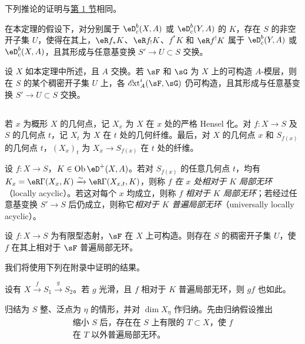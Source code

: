 下列推论的证明与\hyperref[VII:1]{第 1 节}相同。

\begin{corollary_}\label{VII:2-9}
在本定理的假设下，对分别属于 $\eD_c^b(X,A)$ 或 $\eD_c^b(Y,A)$ 的 $K$，存在 $S$ 的非空开子集 $U$，使得在其上，$\eR f_\ast K$、$\eR f_! K$、$f^\ast K$ 和 $\eR f^! K$ 属于 $\eD_c^b(Y,A)$ 或 $\eD_c^b(X,A)$，且其形成与任意基变换 $S' \to U\subset S$ 交换。
\end{corollary_}

\begin{corollary_}\label{VII:2-10}
设 $X$ 如本定理中所述，且 $A$ 交换。若 $\sF$ 和 $\sG$ 为 $X$ 上的可构造 $A$-模层，则在 $S$ 的某个稠密开子集 $U$ 上，各 $\Ext_A^i(\sF,\sG)$ 仍可构造，且其形成与任意基变换 $S' \to U\subset S$ 交换。
\end{corollary_}

\subsection{}\label{VII:2-11}

若 $x$ 为概形 $X$ 的几何点，记 $X_x$ 为 $X$ 在 $x$ 处的严格 Hensel 化。对 $f:X\to S$ 及 $S$ 的几何点 $t$，记 $X_t$ 为 $X$ 在 $t$ 处的几何纤维。最后，对 $X$ 的几何点 $x$ 和 $S_{f(x)}$ 的几何点 $t$，$(X_x)_t$ 为 $X_x \to S_{f(x)}$ 在 $t$ 处的纤维。

\begin{definition_}\label{VII:2-12}
设 $f:X\to S$，$K\in \ob\eD^+(X,A)$。若对 $S_{f(x)}$ 的任意几何点 $t$，均有 $K_x=\eR\Gamma(X_x,K)\iso \eR\Gamma(X_{x,t},K)$，则称 $f$ \emph{在 $x$ 处相对于 $K$ 局部无环}（locally acyclic）。若这对每个 $x$ 均成立，则称 $f$ \emph{相对于 $K$ 局部无环}；若经过任意基变换 $S' \to S$ 后仍成立，则称它\emph{相对于 $K$ 普遍局部无环}（universally locally acyclic）。
\end{definition_}

\begin{theorem_}\label{VII:2-13}
设 $f:X\to S$ 为有限型态射，$\sF$ 在 $X$ 上可构造。则存在 $S$ 的稠密开子集 $U$，使 $f$ 在其上相对于 $\sF$ 普遍局部无环。
\end{theorem_}

我们将使用下列在附录中证明的结果。

\begin{lemma_}\label{VII:2-14}
设有 $X\xrightarrow f S_1 \xrightarrow g S_2$。若 $g$ 光滑，且 $f$ 相对于 $K$ 普遍局部无环，则 $g f$ 也如此。
\end{lemma_}

归结为 $S$ 整、泛点为 $\eta$ 的情形，并对 $\dim{X_\eta}$ 作归纳。先由归纳假设推出
\begin{equation*}\tag{A}\label{VII:eq:2-14-1}
  \begin{array}{c}
    \text{缩小 $S$ 后，存在在 $S$ 上有限的 $T\subset X$，使 $f$} \\
    \text{在 $T$ 以外普遍局部无环。}
  \end{array}
\end{equation*}

